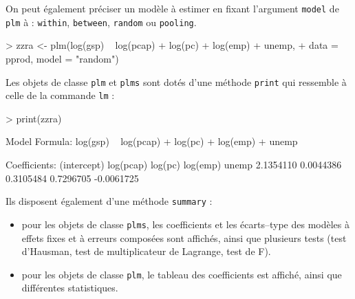 \documentclass[a4paper]{article}
\begin{document}
On peut également préciser un modèle à estimer en fixant l'argument
\texttt{model} de \texttt{plm} à : \texttt{within}, \texttt{between},
\texttt{random} ou \texttt{pooling}.

\begin{Schunk}
\begin{Sinput}
> zzra <- plm(log(gsp) ~ log(pcap) + log(pc) + log(emp) + unemp, 
+     data = pprod, model = "random")
\end{Sinput}
\end{Schunk}

Les objets de classe \texttt{plm} et \texttt{plms} sont dotés d'une
méthode \texttt{print} qui ressemble à celle de la commande
\texttt{lm} :


\begin{Schunk}
\begin{Sinput}
> print(zzra)
\end{Sinput}
\begin{Soutput}
Model Formula: log(gsp) ~ log(pcap) + log(pc) + log(emp) + unemp

Coefficients:
(intercept)   log(pcap)     log(pc)    log(emp)       unemp 
  2.1354110   0.0044386   0.3105484   0.7296705  -0.0061725 
\end{Soutput}
\end{Schunk}


Ils disposent également d'une méthode \texttt{summary} :
\begin{itemize}
\item pour les objets de classe \texttt{plms}, les coefficients et les
  écarts--type des modèles à effets fixes et à erreurs composées sont affichés, ainsi que
  plusieurs tests (test d'Hausman, test de multiplicateur de Lagrange,
  test de F).
\item pour les objets de classe \texttt{plm}, le tableau des
  coefficients est affiché, ainsi que différentes statistiques.
\end{itemize}
\end{document}
